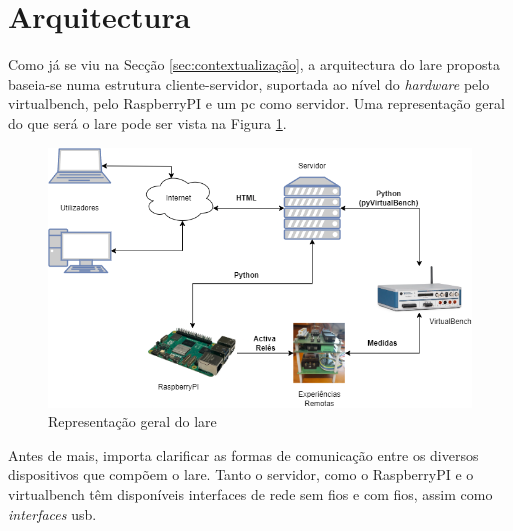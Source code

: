 \section{Arquitectura}
\label{sec:arquitectura}
Como já se viu na Secção \ref{sec:contextualização}, a arquitectura do \acrshort{lare} proposta baseia-se numa estrutura cliente-servidor, suportada ao nível do \textit{hardware} pelo \acrshort{virtualbench}, pelo \gls{RaspberryPI} e um \acrshort{pc} como servidor. Uma representação geral do que será o \acrshort{lare} pode ser vista na Figura \ref{fig:representaçãogerallare}.

\begin{figure}[hbtp]
    \centering
    \includegraphics[width=1\textwidth]{figures/arquitectura_ver2.drawio.png}
    \caption{Representação geral do \acrshort{lare}}
    \label{fig:representaçãogerallare}
\end{figure}

Antes de mais, importa clarificar as formas de comunicação entre os diversos dispositivos que compõem o \acrshort{lare}. Tanto o servidor, como o \gls{RaspberryPI} e o \acrshort{virtualbench} têm disponíveis interfaces de rede sem fios e com fios, assim como \textit{interfaces} \acrshort{usb}.

